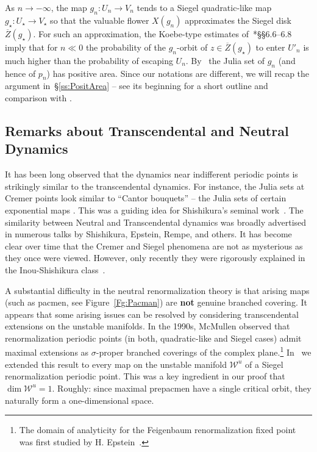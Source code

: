 \documentclass{amsart}
\newcommand{\1}{{\mathbb 1 }}
\newcommand{\str}{{\star}}
\newcommand\WW{\mathcal{W}}
\theoremstyle{remark}
\numberwithin{equation}{section}
\theoremstyle{definition}
\theoremstyle{nonumberbreak}
\begin{document}
As $n\to -\infty$, the map $g_n\colon  U_n\to V_n$ tends to a Siegel quadratic-like map $g_\str\colon U_\str\to V_\str$ so that the valuable flower $X(g_n)$ approximates the Siegel disk $\overline Z(g_\str)$. For such an approximation, the Koebe-type estimates of~\cite{AL-posmeas}*{\S\S6.6--6.8} imply that for $n\ll 0$ the probability of the $g_n$-orbit of $z\in \overline Z(g_\str)$ to enter $U'_n$ is much higher than the probability of escaping $U_n$. By~\cite{AL-AMS} the Julia set of $g_n$ (and hence of $p_n$) has positive area. Since our notations are different, we will recap the argument in~\S\ref{ss:PositArea} -- see its beginning for a short outline and comparison with \cite{AL-posmeas}.






 
   




\subsection{Remarks about Transcendental and Neutral Dynamics} \label{ss:Rem Transc Dynam}It has been long observed that the dynamics near indifferent periodic points is  strikingly similar to the transcendental dynamics. For instance, the Julia sets at Cremer points look similar to ``Cantor bouquets'' -- the Julia sets of certain exponential maps \cite{dg}. This was a guiding idea for Shishikura's seminal work~\cite{Sh:HD}. The similarity between Neutral and Transcendental dynamics was broadly advertised in numerous talks by Shishikura, Epstein, Rempe, and others. It has become clear over time that the Cremer and Siegel phenomena are not as mysterious as they once were viewed. However, only recently they were rigorously explained in the Inou-Shishikura class~\cite{SY,Che}. 



A substantial difficulty in the neutral renormalization theory is that arising maps (such as pacmen, see Figure~\ref{Fg:Pacman}) are {\bf not} genuine branched covering. It appears that some arising issues can be resolved by considering transcendental extensions on the unstable manifolds. In the 1990s, McMullen observed that renormalization periodic points (in both, quadratic-like and Siegel cases) admit maximal extensions as $\sigma$-proper branched coverings of the complex plane.\footnote{The domain of analyticity for the Feigenbaum renormalization fixed point was first studied by H. Epstein~\cites{E1,E2}.} In~\cite{DLS} we extended this result to every map on the unstable manifold $\WW^u$ of a Siegel renormalization periodic point. This was a key ingredient in our proof that $\dim \WW^u=1$. Roughly: since maximal prepacmen have a single critical orbit, they naturally form a one-dimensional space. 
\end{document}
